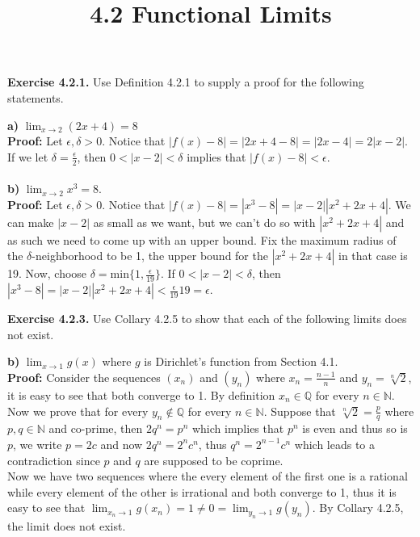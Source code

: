 \documentclass{article}
\title{\textbf{4.2 Functional Limits}}
\begin{document}
	\maketitle
	\textbf{Exercise 4.2.1.} Use Definition 4.2.1 to supply a proof for the following statements.
	\begin{itemize}
		\textbf{a)} $\lim_{x \to 2}(2x + 4) = 8$ \\
		\textbf{Proof:} Let $\epsilon, \delta > 0$. Notice that $|f(x) - 8| = |2x + 4 - 8| = |2x - 4| = 2|x - 2|$. If we let $\delta = \frac{\epsilon}{2}$, then $0 < |x - 2| < \delta$ implies that $|f(x) - 8| < \epsilon$. \\ \\
		\textbf{b)} $\lim_{x \to 2}x^3 = 8$. \\
		\textbf{Proof:} Let $\epsilon, \delta > 0$. Notice that $|f(x) - 8| = |x^3 - 8| = |x - 2||x^2 + 2x + 4|$. We can make $|x - 2|$ as small as we want, but we can't do so with $|x^2 + 2x + 4|$ and as such we need to come up with an upper bound. Fix the maximum radius of the $\delta$-neighborhood to be 1, the upper bound for the $|x^2 + 2x + 4|$ in that case is 19. Now, choose $\delta = \text{min}\{1, \frac{\epsilon}{19}\}$. If $0 < |x - 2| < \delta$, then $|x^3 - 8| = |x - 2||x^2 + 2x + 4| < \frac{\epsilon}{19}19 = \epsilon$.
	\end{itemize}
	\textbf{Exercise 4.2.3.} Use Collary 4.2.5 to show that each of the following limits does not exist.
	\begin{itemize}
		\textbf{b)} $\lim_{x \to 1}g(x)$ where $g$ is Dirichlet's function from Section 4.1. \\
		\textbf{Proof:} Consider the sequences $(x_n)$ and $(y_n)$ where $x_n = \frac{n - 1}{n}$ and $y_n = \sqrt[n]{2}$, it is easy to see that both converge to 1. By definition $x_n \in \mathbb{Q}$ for every $n \in \mathbb{N}$. \\
		Now we prove that for every $y_n \not \in \mathbb{Q}$ for every $n \in \mathbb{N}$. Suppose that $\sqrt[n]{2} = \frac{p}{q}$ where $p,q \in \mathbb{N}$ and co-prime, then $2q^n = p^n$ which implies that $p^n$ is even and thus so is $p$, we write $p = 2c$ and now $2q^n = 2^n c^n$, thus $q^n = 2^{n - 1}c^n$ which leads to a contradiction since $p$ and $q$ are supposed to be coprime. \\
		Now we have two sequences where the every element of the first one is a rational while every element of the other is irrational and both converge to 1, thus it is easy to see that $\lim_{x_n \to 1}g(x_n) = 1 \neq 0 = \lim_{y_n \to 1}g(y_n)$. By Collary 4.2.5, the limit does not exist.
	\end{itemize}
\end{document}
